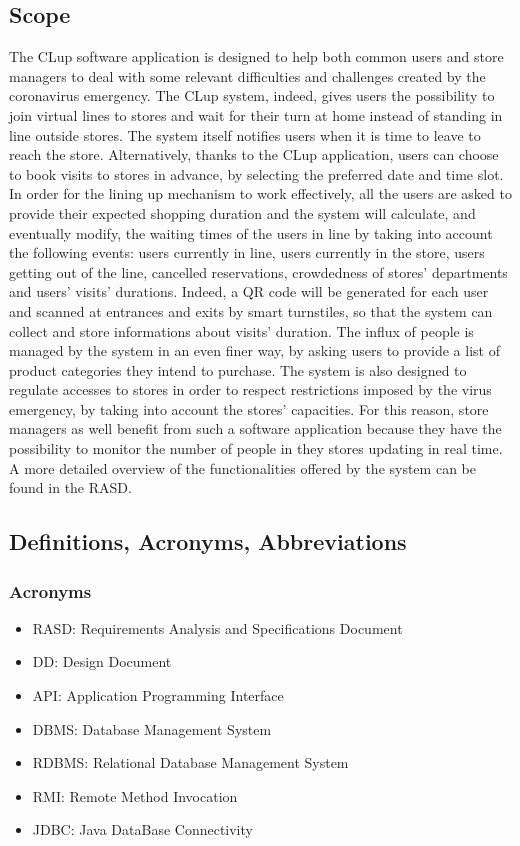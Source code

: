 \documentclass{article}
\begin{document}
\subsection{Scope}
The CLup software application is designed to help both common users and store managers to deal with some relevant difficulties and challenges created by the coronavirus emergency. The CLup system, indeed, gives users the possibility to join virtual lines to stores and wait for their turn at home instead of standing in line outside stores. The system itself notifies users when it is time to leave to reach the store. Alternatively, thanks to the CLup application, users can choose to book visits to stores in advance, by selecting the preferred date and time slot.
 In order for the lining up mechanism to work effectively, all the users are asked to provide their expected shopping duration and the system will calculate, and eventually modify, the waiting times of the users in line by taking into account the following events: users currently in line, users currently in the store, users getting out of the line, cancelled reservations, crowdedness of stores’ departments and users’ visits’ durations. Indeed, a QR code will be generated for each user and scanned at entrances and exits by smart turnstiles, so that the system can collect and store informations about visits’ duration. The influx of people is managed by the system in an even finer way, by asking users to provide a list of product categories they intend to purchase. The system is also designed to regulate accesses to stores in order to respect restrictions imposed by the virus emergency, by taking into account the stores’ capacities. For this reason, store managers as well benefit from such a software application because they have the possibility to monitor the number of people in they stores updating in real time.\\
A more detailed overview of the functionalities offered by the system can be found in the RASD.

\subsection{Definitions, Acronyms, Abbreviations}

\subsubsection{Acronyms}
\begin{itemize}
\item RASD: Requirements Analysis and Specifications Document
\item DD: Design Document
\item API: Application Programming Interface
\item DBMS: Database Management System
\item RDBMS: Relational Database Management System
\item RMI: Remote Method Invocation
\item JDBC: Java DataBase Connectivity
\end{itemize}
\end{document}
